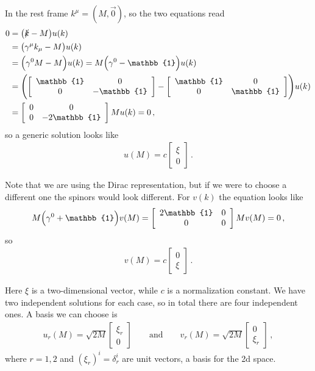 \documentclass[main.tex]{subfiles}
\begin{document}
In the rest frame \(k^{\mu } = (M, \vec{0})\), so the two equations read 
%
\begin{align}
0&= \qty(\slashed{k} - M) u(k)  \\
&= \qty(\gamma^{\mu }k_{\mu } - M) u(k)  \\
&= \qty(\gamma^{0} M - M ) u(k) = M \qty(\gamma^{0} - \mathbb{1}) u(k)  \\
&=\qty( \left[\begin{array}{cc}
\mathbb{1} & 0 \\ 
0 & -\mathbb{1}
\end{array}\right] 
-
\left[\begin{array}{cc}
\mathbb{1} & 0 \\ 
0 & \mathbb{1}
\end{array}\right]
) u(k)  \\
&= \left[\begin{array}{cc}
0 & 0 \\ 
0 & -2 \mathbb{1}
\end{array}\right] M u(k) =0
\,,
\end{align}
%
so a generic solution looks like 
%
\begin{align}
u(M) = c \left[\begin{array}{c}
\xi  \\ 
0
\end{array}\right]
\,.
\end{align}

Note that we are using the Dirac representation, but if we were to choose a different one the spinors would look different. 
For \(v(k)\) the equation looks like 
%
\begin{align}
M \qty(\gamma^{0} + \mathbb{1}) v(M) =
\left[\begin{array}{cc}
2 \mathbb{1} & 0 \\ 
0 & 0
\end{array}\right] M v(M) = 0
\,,
\end{align}
%
so 
%
\begin{align}
v(M) = c \left[\begin{array}{c}
0 \\ 
\xi 
\end{array}\right]
\,.
\end{align}

Here \(\xi \) is a two-dimensional vector, while \(c\) is a normalization constant. 
We have two independent solutions for each case, so in total there are four independent ones. 
A basis we can choose is 
%
\begin{align}
u_{r} (M) = \sqrt{2M} \left[\begin{array}{c}
\xi_{r} \\ 
0
\end{array}\right]
\qquad \text{and} \qquad
v_{r} (M) = \sqrt{2M} \left[\begin{array}{c}
0 \\
\xi_{r} 
\end{array}\right]
\,,
\end{align}
%
where \(r=1,2\) and \((\xi_{r})^{i} = \delta^{i}_{r}\) are unit vectors, a basis for the 2d space. 
\end{document}
